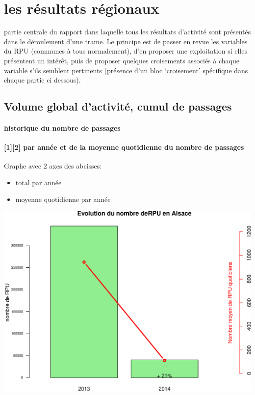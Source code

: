 \documentclass[]{article}
\begin{document}
\section{les résultats régionaux}\label{les-resultats-regionaux}

partie centrale du rapport dans laquelle tous les résultats d'activité
sont présentés dans le déroulement d'une trame. Le principe est de
passer en revue les variables du RPU (communes à tous normalement), d'en
proposer une exploitation si elles présentent un intérêt, puis de
proposer quelques croisements associés à chaque variable s'ils semblent
pertinents (présence d'un bloc `croisement' spécifique dans chaque
partie ci dessous).

\subsection{Volume global d'activité, cumul de
passages}\label{volume-global-dactivite-cumul-de-passages}

\paragraph{historique du nombre de
passages}\label{historique-du-nombre-de-passages}

\paragraph{{[}1{]}{[}2{]} par année et de la moyenne quotidienne du
nombre de
passages}\label{par-annee-et-de-la-moyenne-quotidienne-du-nombre-de-passages}

Graphe avec 2 axes des abcisses:

\begin{itemize}
\itemsep1pt\parskip0pt
\item
  total par année
\item
  moyenne quotidienne par année
\end{itemize}

\includegraphics{rapport_2014_files/figure-latex/c1-1.pdf}
\end{document}
